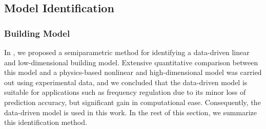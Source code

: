 %
%


\subsection{Model Identification}\label{sec:model_id}

\subsubsection{Building Model}\label{sec:building_model}

In \cite{Zhou:2017modelcomp}, we proposed a semiparametric method for identifying a data-driven linear and low-dimensional building model.
Extensive quantitative comparison between this model and a physics-based nonlinear and high-dimensional model was carried out using experimental data, and we concluded that the data-driven model is suitable for applications such as frequency regulation due to its minor loss of prediction accuracy, but significant gain in computational ease.
Consequently, the data-driven model is used in this work. 
In the rest of this section, we summarize this identification method.



